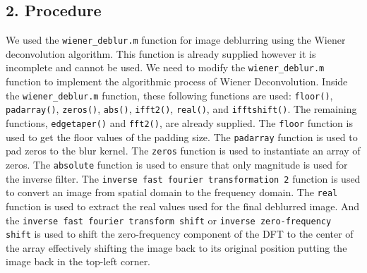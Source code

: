 \documentclass{article}
\begin{document}
	\subsection*{2. Procedure}
	We used the {\texttt{wiener\_deblur.m}} function for image deblurring using the Wiener deconvolution algorithm. This function is already supplied however it is incomplete and cannot be used. 
	We need to modify the {\texttt{wiener\_deblur.m}} function to implement the algorithmic process of Wiener Deconvolution. Inside the {\texttt{wiener\_deblur.m}} function, these following 
	functions are used: {\texttt{floor()}}, {\texttt{padarray()}}, {\texttt{zeros()}}, {\texttt{abs()}}, {\texttt{ifft2()}}, {\texttt{real()}}, and {\texttt{ifftshift()}}. 
	The remaining functions, {\texttt{edgetaper()}} and {\texttt{fft2()}}, are already supplied. The {\texttt{floor}} function is used to get the floor values of the padding size. 
	The {\texttt{padarray}} function is used to pad zeros to the blur kernel. 
	The {\texttt{zeros}} function is used to instantiate an array of zeros. 
	The {\texttt{absolute}} function is used to ensure that only magnitude is used for the inverse filter. 
	The {\texttt{inverse fast fourier transformation 2}} function is used to convert an image from spatial domain to the frequency domain. 
	The {\texttt{real}} function is used to extract the real values used for the final deblurred image. 
	And the {\texttt{inverse fast fourier transform shift}} or {\texttt{inverse zero-frequency shift}} is used to shift the zero-frequency component of the DFT to the center of the array 
	effectively shifting the image back to its original position putting the image back in the top-left corner.
	
\end{document}
